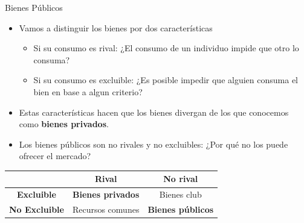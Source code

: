 \documentclass{beamer}
\begin{document}
\begin{frame}{Bienes Públicos}
    \begin{itemize}
        \item Vamos a distinguir los bienes por dos características
        \begin{itemize}
            \item Si su consumo es rival: ¿El consumo de un individuo impide que otro lo consuma?
            \item Si su consumo es excluible: ¿Es posible impedir que alguien consuma el bien en base a algun criterio?
        \end{itemize}
        \item Estas características hacen que los bienes divergan de los que conocemos como \textbf{bienes privados}.
        \item Los bienes públicos son no rivales y no excluibles: ¿Por qué no los puede ofrecer el mercado?
    \end{itemize}
    \begin{table}[]
        \centering
        \begin{tabular}{|c|c|c|}
    \hline
                        & \textbf{Rival}   & \textbf{No rival} \\ \hline
    \textbf{Excluible}    & \textbf{Bienes privados}  & Bienes club       \\ \hline
    \textbf{No Excluible} & Recursos comunes & \textbf{Bienes públicos}   \\ \hline
    \end{tabular}
    \end{table}
\end{frame}
\end{document}
